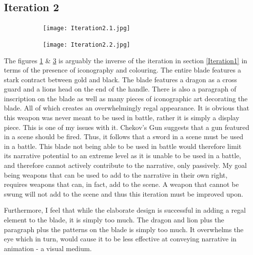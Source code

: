\documentclass{article}
\begin{document}
\subsection{Iteration 2} \label{Iteration2}

\begin{figure}[h]
    \centering
    \caption{}
    \label{fig:Iteration2}
    \begin{subfigure}{0.3\textwidth}
        \texttt{[image: Iteration2.1.jpg]}
        \caption{}
        \label{fig:Iteration2.1}
    \end{subfigure}
    \begin{subfigure}{0.3\textwidth}
        \texttt{[image: Iteration2.2.jpg]}
        \caption{}
        \label{fig:Iteration2.2}
    \end{subfigure}
\end{figure}

The figures \ref{fig:Iteration2.1} & \ref{fig:Iteration2.2} is arguably the inverse of the iteration in section \ref{Iteration1} in terms of the presence of iconography and colouring. The entire blade features a stark contract between gold and black. The blade features a dragon as a cross guard and a lions head on the end of the handle. There is also a paragraph of inscription on the blade as well as many pieces of iconographic art decorating the blade. All of which creates an overwhelmingly regal appearance. It is obvious that this weapon was never meant to be used in battle, rather it is simply a display piece. This is one of my issues with it. Chekov's Gun suggests that a gun featured in a scene should be fired. Thus, it follows that a sword in a scene must be used in a battle. This blade not being able to be used in battle would therefore limit its narrative potential to an extreme level as it is unable to be used in a battle, and therefore cannot actively contribute to the narrative, only passively. My goal being weapons that can be used to add to the narrative in their own right, requires weapons that can, in fact, add to the scene. A weapon that cannot be swung will not add to the scene and thus this iteration must be improved upon.

Furthermore, I feel that while the elaborate design is successful in adding a regal element to the blade, it is simply too much. The dragon and lion plus the paragraph plus the patterns on the blade is simply too much. It overwhelms the eye which in turn, would cause it to be less effective at conveying narrative in animation - a visual medium.
\end{document}
